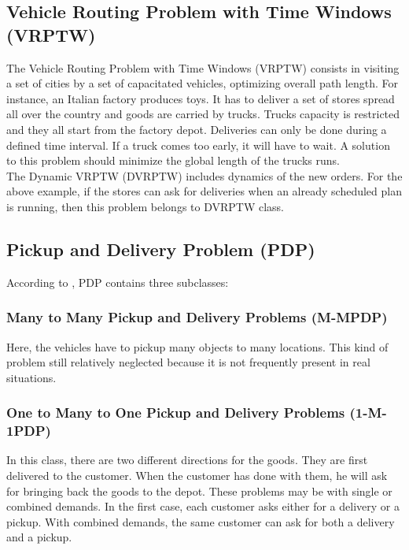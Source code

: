 \documentclass[journal]{IEEEtran}
\begin{document}
\subsection{Vehicle Routing Problem with Time Windows (VRPTW)}
The Vehicle Routing Problem with Time Windows \cite{Bianchi00} (VRPTW)
consists in visiting a set of cities by a set of capacitated vehicles,
optimizing overall path length. For instance, an Italian factory produces toys. It has
to deliver a set of stores spread all over the country and goods are carried by trucks. Trucks capacity is
restricted and they all start from the factory depot. Deliveries can only be
done during a defined time interval. If a truck comes too early, it will have to
wait. A solution to this problem should minimize the global length of the trucks
runs.\\

The Dynamic VRPTW (DVRPTW) includes dynamics of the new orders. For the above example, if the stores can ask for deliveries when an already scheduled
plan is running, then this problem belongs to DVRPTW class.

\subsection{Pickup and Delivery Problem (PDP)}
According to \cite{Berbeglia07}, PDP contains three subclasses:\\

\subsubsection{Many to Many Pickup and Delivery Problems (M-MPDP) }

Here, the vehicles have to pickup many objects to many locations. This
kind of problem still relatively neglected because it is not frequently present
in real situations.\\ %

\subsubsection{One to Many to One Pickup and Delivery Problems (1-M-1PDP) }

In this class, there are two different directions for the goods. They are first
delivered to the customer. When the customer has done with them, he will ask
for bringing back the goods to the depot. These problems may be with single or
combined demands. In the first case, each customer asks either for a delivery or a
pickup. With combined demands, the same customer can ask for both a delivery and a
pickup.\\
\end{document}
